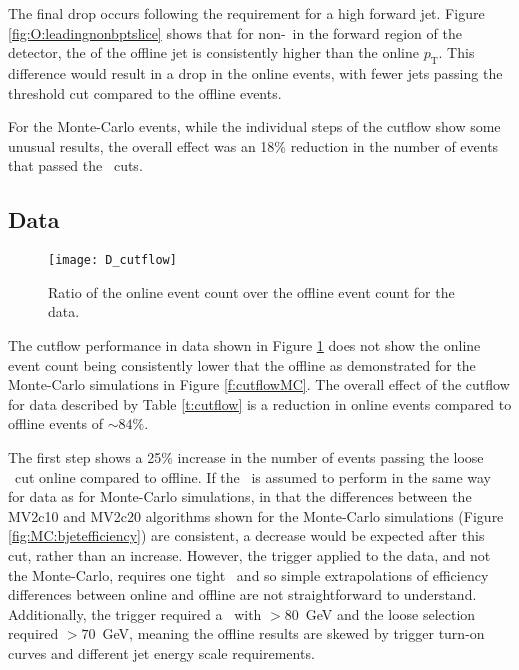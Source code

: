     The final drop occurs following the requirement for a high \pt forward jet. Figure \ref{fig:O:leadingnonbptslice} shows that for non-\bjets\ in the forward region of the detector, the \pt of the offline jet is consistently higher than the online $p_\text{T}$. This difference would result in a drop in the online events, with fewer jets passing the threshold \pt cut compared to the offline events.

    For the Monte-Carlo events, while the individual steps of the cutflow show some unusual results, the overall effect was an 18\% reduction in the number of events that passed the \VBFHBB\, cuts.

    \subsection{Data}
        \begin{figure}[h]
            \centering
            \texttt{[image: D\_cutflow]}
            \caption[\VBFHBB\ Cutflow ratio for data]{Ratio of the online event count over the offline event count for the data.}
            \label{f:cutflowD}
        \end{figure}

    The cutflow performance in data shown in Figure \ref{f:cutflowD} does not show the online event count being consistently lower that the offline as demonstrated for the Monte-Carlo simulations in Figure \ref{f:cutflowMC}. The overall effect of the cutflow for data described by Table \ref{t:cutflow} is a reduction in online events compared to offline events of $\sim84\%$.

    The first step shows a 25\% increase in the number of events passing the loose \bjets\ cut online compared to offline. If the \btag\ is assumed to perform in the same way for data as for Monte-Carlo simulations, in that the differences between the MV2c10 and MV2c20 algorithms shown for the Monte-Carlo simulations (Figure \ref{fig:MC:bjetefficiency}) are consistent, a decrease would be expected after this cut, rather than an increase. However, the trigger applied to the data, and not the Monte-Carlo, requires one tight \bjet\ and so simple extrapolations of efficiency differences between online and offline are not straightforward to understand. Additionally, the trigger required a \bjet\ with \pt$>80$~GeV and the loose selection required \bjets $>70$~GeV, meaning the offline results are skewed by trigger turn-on curves and different jet energy scale requirements.

